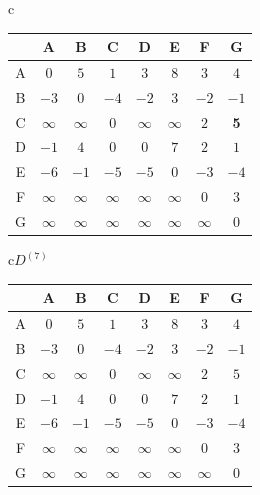 \begin{pastsoln}
\begin{center}
\begin{tabular}[t]{c}
\begin{tabular}{c|*{7}{c}}
 & A & B & C & D & E & F & G \\ \hline
A & $0$ & $5$ & $1$ & $3$ & $8$ & $3$ & $4$ \\
B & $-3$ & $0$ & $-4$ & $-2$ & $3$ & $-2$ & $-1$ \\
C & $\infty$ & $\infty$ & $0$ & $\infty$ & $\infty$ & $2$ & \textbf{5} \\
D & $-1$ & $4$ & $0$ & $0$ & $7$ & $2$ & $1$ \\
E & $-6$ & $-1$ & $-5$ & $-5$ & $0$ & $-3$ & $-4$ \\
F & $\infty$ & $\infty$ & $\infty$ & $\infty$ & $\infty$ & $0$ & $3$ \\
G & $\infty$ & $\infty$ & $\infty$ & $\infty$ & $\infty$ & $\infty$ & $0$ \\
\end{tabular}
\end{tabular}\qquad
\begin{tabular}[t]{c}$D^{(7)}$\\[2pt]
\begin{tabular}{c|*{7}{c}}
 & A & B & C & D & E & F & G \\ \hline
A & $0$ & $5$ & $1$ & $3$ & $8$ & $3$ & $4$ \\
B & $-3$ & $0$ & $-4$ & $-2$ & $3$ & $-2$ & $-1$ \\
C & $\infty$ & $\infty$ & $0$ & $\infty$ & $\infty$ & $2$ & $5$ \\
D & $-1$ & $4$ & $0$ & $0$ & $7$ & $2$ & $1$ \\
E & $-6$ & $-1$ & $-5$ & $-5$ & $0$ & $-3$ & $-4$ \\
F & $\infty$ & $\infty$ & $\infty$ & $\infty$ & $\infty$ & $0$ & $3$ \\
G & $\infty$ & $\infty$ & $\infty$ & $\infty$ & $\infty$ & $\infty$ & $0$ \\
\end{tabular}
\end{tabular}
\end{center}


\end{pastsoln}
